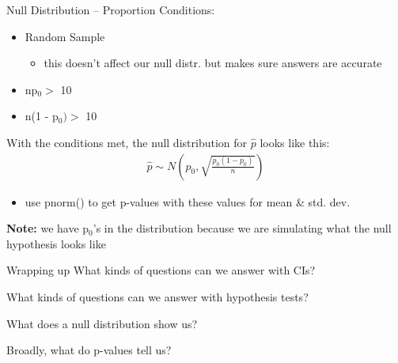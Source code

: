 \documentclass{beamer}
\begin{document}
\begin{frame}{Null Distribution -- Proportion}
Conditions:
\begin{itemize}
    \item Random Sample
    \begin{itemize}
        \item this doesn't affect our null distr. but makes sure answers are accurate
    \end{itemize}
    \item np$_0 >$ 10
    \item n(1 - p$_0) >$ 10
\end{itemize} \vspace{4mm}

With the conditions met, the null distribution for $\widehat{p}$ looks like this:
\begin{align*}
    \widehat{p} \sim N(p_0, \sqrt{\frac{p_0(1 - p_0)}{n}})
\end{align*}
\begin{itemize}
    \item use pnorm() to get p-values with these values for mean \& std. dev.
\end{itemize} \vspace{2mm}
\textbf{Note:} we have p$_0$'s in the distribution because we are simulating what the null hypothesis looks like
\end{frame}


\begin{frame}{Wrapping up}
What kinds of questions can we answer with CIs? \vspace{8mm}

What kinds of questions can we answer with hypothesis tests? \vspace{8mm}

What does a null distribution show us?
\vspace{8mm}

Broadly, what do p-values tell us?
\end{frame}

%
%
\end{document}
